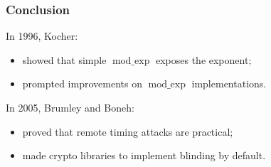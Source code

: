 \documentclass{beamer}
\DeclareMathOperator{\modexp}{mod\_exp}
\begin{document}
\begin{frame}
\frametitle{Conclusion}

In 1996, Kocher:
\begin{itemize}
  \item showed that simple $\modexp$ exposes the exponent;
  \item prompted improvements on $\modexp$ implementations.
\end{itemize}

In 2005, Brumley and Boneh:
\begin{itemize}
  \item proved that remote timing attacks are practical;
  \item made crypto libraries to implement blinding by default.
\end{itemize}

\end{frame}
\end{document}
